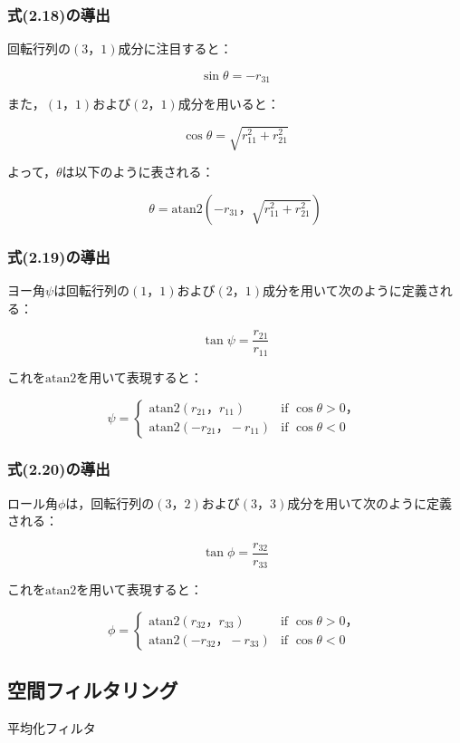 \subsubsection{式(2.18)の導出}

回転行列の$(3，1)$成分に注目すると：

\[
  \sin \theta = -r_{31}
\]

また，$(1，1)$および$(2，1)$成分を用いると：

\[
  \cos \theta = \sqrt{r_{11}^2 + r_{21}^2}
\]

よって，$\theta$は以下のように表される：

\[
  \theta = \text{atan2} \left( -r_{31}， \sqrt{r_{11}^2 + r_{21}^2} \right) \tag{2.18}
\]

\subsubsection{式(2.19)の導出}

ヨー角$\psi$は回転行列の$(1，1)$および$(2，1)$成分を用いて次のように定義される：

\[
  \tan \psi = \frac{r_{21}}{r_{11}}
\]

これを$\text{atan2}$を用いて表現すると：

\[
  \psi = 
  \begin{cases}
    \text{atan2}(r_{21}， r_{11})   & \text{if } \cos \theta > 0， \\ 
    \text{atan2}(-r_{21}， -r_{11}) & \text{if } \cos \theta < 0
  \end{cases} \tag{2.19}
\]


\subsubsection{式(2.20)の導出}

ロール角$\phi$は，回転行列の$(3，2)$および$(3，3)$成分を用いて次のように定義される：

\[
  \tan \phi = \frac{r_{32}}{r_{33}}
\]

これを$\text{atan2}$を用いて表現すると：

\[
  \phi = 
  \begin{cases}
    \text{atan2}(r_{32}， r_{33})   & \text{if } \cos \theta > 0， \\ 
    \text{atan2}(-r_{32}， -r_{33}) & \text{if } \cos \theta < 0
  \end{cases} \tag{2.20}
\]



\subsection{空間フィルタリング}
平均化フィルタ

